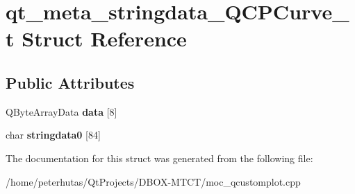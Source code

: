 \hypertarget{structqt__meta__stringdata___q_c_p_curve__t}{}\section{qt\+\_\+meta\+\_\+stringdata\+\_\+\+Q\+C\+P\+Curve\+\_\+t Struct Reference}
\label{structqt__meta__stringdata___q_c_p_curve__t}
\subsection*{Public Attributes}
\begin{DoxyCompactItemize}
\item 
\mbox{\label{structqt__meta__stringdata___q_c_p_curve__t_a7398cd60d68a5b116f4a9337e17df11d}} 
Q\+Byte\+Array\+Data {\bfseries data} \mbox{[}8\mbox{]}
\item 
\mbox{\label{structqt__meta__stringdata___q_c_p_curve__t_a48e3deecb80ff42a459075e2246e712f}} 
char {\bfseries stringdata0} \mbox{[}84\mbox{]}
\end{DoxyCompactItemize}


The documentation for this struct was generated from the following file\+:\begin{DoxyCompactItemize}
\item 
/home/peterhutas/\+Qt\+Projects/\+D\+B\+O\+X-\/\+M\+T\+C\+T/moc\+\_\+qcustomplot.\+cpp\end{DoxyCompactItemize}
